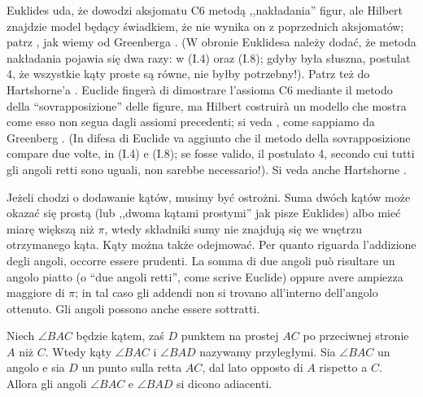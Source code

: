 Euklides uda, że dowodzi aksjomatu C6 metodą ,,nakładania'' figur, ale Hilbert znajdzie model będący świadkiem, że nie wynika on z poprzednich aksjomatów; patrz \cite[paragraf 11]{hilbert_1988}, jak wiemy od Greenberga \cite[s. 200]{greenberg_2010}. %
(W obronie Euklidesa należy dodać, że metoda nakładania pojawia się dwa razy: w (I.4) oraz (I.8); gdyby była słuszna, postulat 4, że wszystkie kąty proste są równe, nie byłby potrzebny!). %
Patrz też do Hartshorne'a \cite[s. 148-158]{hartshorne_2000}. %
Euclide fingerà di dimostrare l'assioma C6 mediante il metodo della ``sovrapposizione'' delle figure, ma Hilbert costruirà un modello che mostra come esso non segua dagli assiomi precedenti; si veda \cite[paragrafo 11]{hilbert_1988}, come sappiamo da Greenberg \cite[p. 200]{greenberg_2010}. %
(In difesa di Euclide va aggiunto che il metodo della sovrapposizione compare due volte, in (I.4) e (I.8); se fosse valido, il postulato 4, secondo cui tutti gli angoli retti sono uguali, non sarebbe necessario!). %
Si veda anche Hartshorne \cite[p. 148-158]{hartshorne_2000}. %

Jeżeli chodzi o dodawanie kątów, musimy być ostrożni. %
Suma dwóch kątów może okazać się prostą (lub ,,dwoma kątami prostymi'' jak pisze Euklides) albo mieć miarę większą niż $\pi$, wtedy składniki sumy nie znajdują się we wnętrzu otrzymanego kąta. %
Kąty można także odejmować. %
Per quanto riguarda l'addizione degli angoli, occorre essere prudenti. %
La somma di due angoli può risultare un angolo piatto (o ``due angoli retti'', come scrive Euclide) oppure avere ampiezza maggiore di $\pi$; in tal caso gli addendi non si trovano all'interno dell'angolo ottenuto. %
Gli angoli possono anche essere sottratti. %

\begin{definition}
[kąt przyległy] %
[angolo adiacente] %
    Niech $\angle BAC$ będzie kątem, zaś $D$ punktem na prostej $AC$ po przeciwnej stronie $A$ niż $C$. %
    Wtedy kąty $\angle BAC$ i $\angle BAD$ nazywamy przyległymi. %
    Sia $\angle BAC$ un angolo e sia $D$ un punto sulla retta $AC$, dal lato opposto di $A$ rispetto a $C$. %
    Allora gli angoli $\angle BAC$ e $\angle BAD$ si dicono adiacenti. %
\end{definition}

